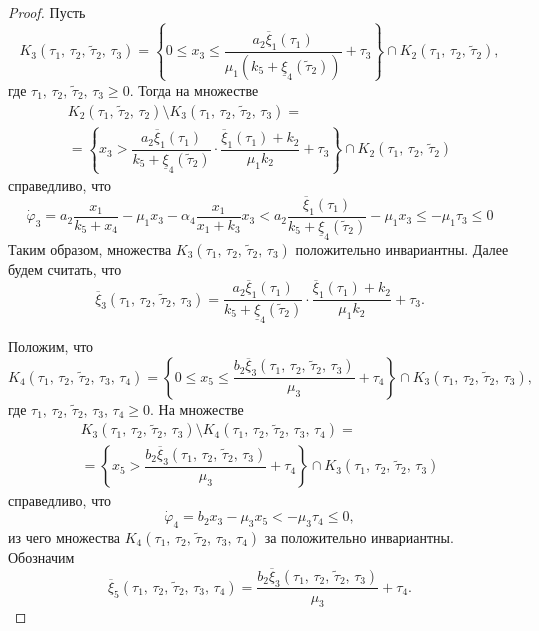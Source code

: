 \documentclass[14pt,a4paper]{extarticle}
\begin{document}
\begin{proof}
		Пусть 
		\[K_3(\tau_1,\,\tau_2,\, \tilde{\tau}_2,\,\tau_3) = \left\{0 \leqslant x_3 \leqslant \dfrac{a_2\overline{\xi}_1(\tau_1)}{\mu_1(k_5+\underline{\xi}_4(\tilde{\tau}_2))}+\tau_3\right\}\cap K_2(\tau_1,\, \tau_2,\, \tilde{\tau}_2),\]
		где $\tau_1,\,\tau_2,\,\tilde{\tau}_2,\,\tau_3 \geqslant 0$. Тогда на множестве 
		\begin{multline*}
			K_2(\tau_1,\, \tilde{\tau}_2,\, \tau_2)\setminus K_3(\tau_1,\,\tau_2,\, \tilde{\tau}_2,\, \tau_3)=\\
			=\left\{x_3 > \dfrac{a_2\overline{\xi}_1(\tau_1)}{k_5+\underline{\xi}_4(\tilde{\tau}_2)}\cdot\dfrac{\overline{\xi}_1(\tau_1)+k_2}{\mu_1k_2} + \tau_3\right\}\cap K_2(\tau_1,\, \tau_2,\, \tilde{\tau}_2)
		\end{multline*}
		справедливо, что
		\[\dot{\varphi}_3 = a_2\dfrac{x_1}{k_5+x_4}-\mu_1x_3-\alpha_4\dfrac{x_1}{x_1+k_3}x_3 < a_2\dfrac{\overline{\xi}_1(\tau_1)}{k_5+\underline{\xi}_4(\tilde{\tau}_2)}-\mu_1x_3 \le -\mu_1\tau_3 \le 0\]
		Таким образом, множества $K_3(\tau_1,\,\tau_2,\, \tilde{\tau}_2,\, \tau_3)$ положительно инвариантны. Далее будем считать, что
		\[\overline{\xi}_3(\tau_1,\,\tau_2,\, \tilde{\tau}_2,\, \tau_3) = \dfrac{a_2\overline{\xi}_1(\tau_1)}{k_5+\underline{\xi}_4(\tilde{\tau}_2)}\cdot\dfrac{\overline{\xi}_1(\tau_1)+k_2}{\mu_1k_2} + \tau_3.\]
		
		Положим, что 
		\[K_4(\tau_1,\,\tau_2,\, \tilde{\tau}_2,\, \tau_3,\,\tau_4) = \left\{0 \leqslant x_5 \leqslant \dfrac{b_2\overline{\xi}_3(\tau_1,\,\tau_2,\, \tilde{\tau}_2,\, \tau_3)}{\mu_3}+\tau_4\right\}\cap K_3(\tau_1,\,\tau_2,\, \tilde{\tau}_2,\, \tau_3),\]
		где $\tau_1,\,\tau_2,\, \tilde{\tau}_2,\, \tau_3,\,\tau_4 \geqslant 0$. На множестве 
		\begin{multline*}
			K_3(\tau_1,\,\tau_2,\, \tilde{\tau}_2,\, \tau_3)\setminus K_4(\tau_1,\,\tau_2,\,\tilde{\tau}_2,\,\tau_3,\,\tau_4) =\\
			=\left\{x_5 > \dfrac{b_2\overline{\xi}_3(\tau_1,\,\tau_2,\,\tilde{\tau}_2,\,\tau_3)}{\mu_3}+\tau_4\right\}\cap K_3(\tau_1,\,\tau_2,\, \tilde{\tau}_2,\, \tau_3)
		\end{multline*}
		справедливо, что
		\[\dot{\varphi}_4 = b_2x_3 - \mu_3x_5 < -\mu_3\tau_4 \leqslant 0,\]
		из чего множества $K_4(\tau_1,\,\tau_2,\,\tilde{\tau}_2,\,\tau_3,\,\tau_4)$ за положительно инвариантны. Обозначим
		\[\overline{\xi}_5(\tau_1,\,\tau_2,\,\tilde{\tau}_2,\,\tau_3,\,\tau_4) = \dfrac{b_2\overline{\xi}_3(\tau_1,\,\tau_2,\,\tilde{\tau}_2,\,\tau_3)}{\mu_3}+\tau_4.\]
		

\end{proof}
\end{document}
